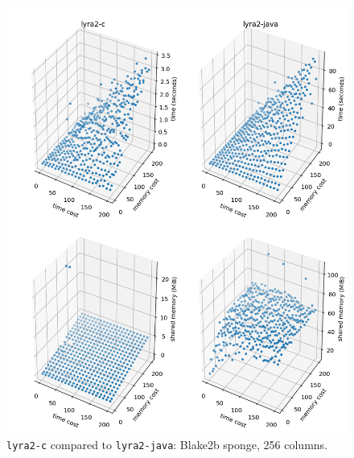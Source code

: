\begin{figure}[p]
    \centering
    \includegraphics[width=\linewidth,keepaspectratio]{figures/tcost_mcost_blake2b_256}
    \caption{\texttt{lyra2-c} compared to \texttt{lyra2-java}: Blake2b sponge, 256 columns.}
    \label{figure:tcost_mcost_blake2b_256}
\end{figure}

